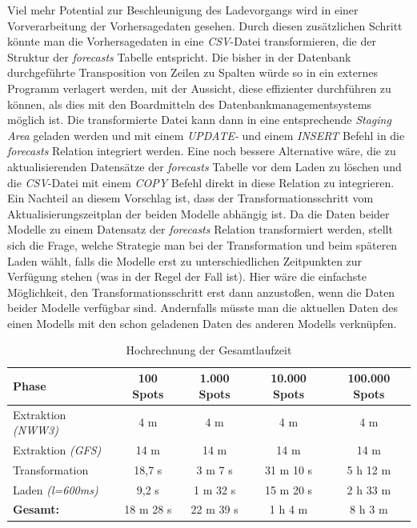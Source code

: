 Viel mehr Potential zur Beschleunigung des Ladevorgangs wird in einer
Vorverarbeitung der Vorhersagedaten gesehen. Durch diesen zusätzlichen
Schritt könnte man die Vorhersagedaten in eine \textit{CSV}-Datei
transformieren, die der Struktur der \textit{forecasts} Tabelle
entspricht. Die bisher in der Datenbank durchgeführte Transposition
von Zeilen zu Spalten würde so in ein externes Programm verlagert
werden, mit der Aussicht, diese effizienter durchführen zu können, als
dies mit den Boardmitteln des Datenbankmanagementsystems möglich
ist. Die transformierte Datei kann dann in eine entsprechende
\textit{Staging Area} geladen werden und mit einem \textit{UPDATE-}
und einem \textit{INSERT} Befehl in die \textit{forecasts} Relation
integriert werden. Eine noch bessere Alternative wäre, die zu
aktualisierenden Datensätze der \textit{forecasts} Tabelle vor dem
Laden zu löschen und die \textit{CSV}-Datei mit einem \textit{COPY}
Befehl direkt in diese Relation zu integrieren. Ein Nachteil an diesem
Vorschlag ist, dass der Transformationsschritt vom
Aktualisierungszeitplan der beiden Modelle abhängig ist. Da die Daten
beider Modelle zu einem Datensatz der \textit{forecasts} Relation
transformiert werden, stellt sich die Frage, welche Strategie man bei
der Transformation und beim späteren Laden wählt, falls die Modelle
erst zu unterschiedlichen Zeitpunkten zur Verfügung stehen (was in der
Regel der Fall ist). Hier wäre die einfachste Möglichkeit, den
Transformationsschritt erst dann anzustoßen, wenn die Daten beider
Modelle verfügbar sind. Andernfalls müsste man die aktuellen Daten des
einen Modells mit den schon geladenen Daten des anderen Modells
verknüpfen.

\begin{table}[h]
  \centering
  {\sf
    \footnotesize
    \begin{longtable}{l|c|c|c|c}

      \toprule
      \textbf{Phase} & \textbf{100 Spots} & \textbf{1.000 Spots} & \textbf{10.000 Spots} & \textbf{100.000 Spots}\\
      \midrule
      Extraktion \textit{(NWW3)} & 4 m & 4 m & 4 m & 4 m \\
      Extraktion \textit{(GFS)} & 14 m & 14 m & 14 m & 14 m \\
      \midrule
      Transformation & 18,7 s & 3 m 7 s & 31 m 10 s & 5 h 12 m \\
      Laden \textit{(l=600ms)} & 9,2 s & 1 m 32 s & 15 m 20 s & 2 h 33 m \\
      \bottomrule
      \textbf{Gesamt:} & 18 m 28 s & 22 m 39 s & 1 h 4 m & 8 h 3 m \\
      \bottomrule
    \end{longtable}
  }

  \caption{Hochrechnung der Gesamtlaufzeit}
  \label{tab:gesamt_laufzeit}

\end{table}

